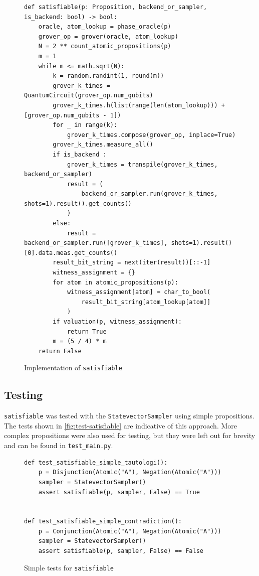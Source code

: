 \begin{figure}[H]
\centering
\begin{verbatim}
def satisfiable(p: Proposition, backend_or_sampler, is_backend: bool) -> bool:
    oracle, atom_lookup = phase_oracle(p)
    grover_op = grover(oracle, atom_lookup)
    N = 2 ** count_atomic_propositions(p)
    m = 1
    while m <= math.sqrt(N):
        k = random.randint(1, round(m))
        grover_k_times = QuantumCircuit(grover_op.num_qubits)
        grover_k_times.h(list(range(len(atom_lookup))) + [grover_op.num_qubits - 1])
        for _ in range(k):
            grover_k_times.compose(grover_op, inplace=True)
        grover_k_times.measure_all()
        if is_backend :
            grover_k_times = transpile(grover_k_times, backend_or_sampler)
            result = (
                backend_or_sampler.run(grover_k_times, shots=1).result().get_counts()
            )
        else:
            result = backend_or_sampler.run([grover_k_times], shots=1).result()[0].data.meas.get_counts()
        result_bit_string = next(iter(result))[::-1]
        witness_assignment = {}
        for atom in atomic_propositions(p):
            witness_assignment[atom] = char_to_bool(
                result_bit_string[atom_lookup[atom]]
            )
        if valuation(p, witness_assignment):
            return True
        m = (5 / 4) * m
    return False
\end{verbatim}
\caption{Implementation of \texttt{satisfiable} }
\label{fig:satisfiable}
\end{figure}

\subsection{Testing}\label{subsec:testing}

\texttt{satisfiable} was tested with the \texttt{StatevectorSampler} using simple propositions.
The tests shown in \autoref{fig:test-satisfiable} are indicative of this approach.
More complex propositions were also used for testing, but they were left out for brevity and can be found in \texttt{test\_main.py}.

\begin{figure}[H]
\centering
\begin{verbatim}
def test_satisfiable_simple_tautologi():
    p = Disjunction(Atomic("A"), Negation(Atomic("A")))
    sampler = StatevectorSampler()
    assert satisfiable(p, sampler, False) == True


def test_satisfiable_simple_contradiction():
    p = Conjunction(Atomic("A"), Negation(Atomic("A")))
    sampler = StatevectorSampler()
    assert satisfiable(p, sampler, False) == False
\end{verbatim}
\caption{Simple tests for \texttt{satisfiable}}
\label{fig:test-satisfiable}
\end{figure}

